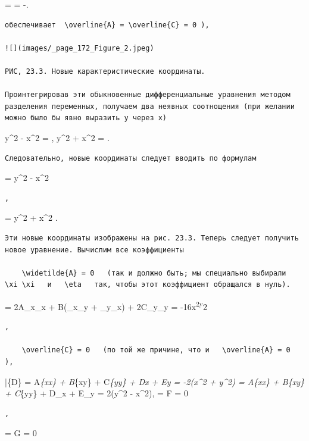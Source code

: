 \documentclass[
  ukrainian,
]{article}
\begin{document}
 =  = -.

\begin{verbatim}
обеспечивает  \overline{A} = \overline{C} = 0 ),

![](images/_page_172_Figure_2.jpeg)

РИС, 23.3. Новые карактеристические координаты.

Проинтегрировав эти обыкновенные дифференциальные уравнения методом разделения переменных, получаем два неявных соотнощения (при желании можно было бы явно выразить у через х)
\end{verbatim}

y\^{}2 - x\^{}2 = , y\^{}2 + x\^{}2 = .

\begin{verbatim}
Следовательно, новые координаты следует вводить по формулам
\end{verbatim}

\xi = y\^{}2 - x\^{}2

\begin{verbatim}
,
\end{verbatim}

\eta = y\^{}2 + x\^{}2 .

\begin{verbatim}
Эти новые координаты изображены на рис. 23.3. Теперь следует получить новое уравнение. Вычислим все коэффициенты

    \widetilde{A} = 0   (так и должно быть; мы специально выбирали   \xi \xi   и   \eta   так, чтобы этот коэффициент обращался в нуль).
\end{verbatim}

 = 2A\xi\_x\eta\_x + B(\xi\_x\eta\_y + \xi\_y\eta\_x) +
2C\xi\_y\eta\_y = -16x\textsuperscript{2y}2

\begin{verbatim}
,

    \overline{C} = 0   (по той же причине, что и   \overline{A} = 0  ),
\end{verbatim}

\bar\{D\} = A\xi\emph{\{xx\} + B\xi}\{xy\} + C\xi\emph{\{yy\} +
D\xi\emph{x + E\xi\emph{y = -2(x\^{}2 + y\^{}2)  =
A\eta}\{xx\} + B\eta}\{xy\} + C\eta}\{yy\} + D\eta\_x + E\eta\_y =
2(y\^{}2 - x\^{}2),  = F = 0

\begin{verbatim}
,
\end{verbatim}

 = G = 0
\end{document}
